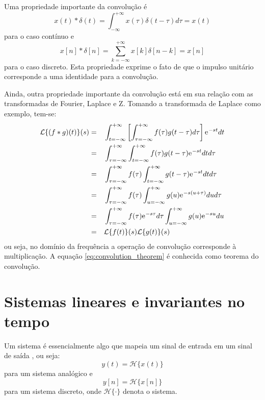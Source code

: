 \documentclass[12pt,a4paper]{report}
\newcommand{\euler}{{\mathrm{e}\mkern1mu}}
\begin{document}
  Uma propriedade importante da convolução é
  \begin{equation}
    \label{eq:continuous_convolution_identity}
    x(t) \ast \delta(t) = \int_{-\infty}^{+\infty} x(\tau) \delta(t - \tau) d\tau = x(t)
  \end{equation}
  para o caso contínuo e
  \begin{equation}
    \label{eq:discrete_convolution_identity}
    x[n] \ast \delta[n] = \sum_{k = -\infty}^{+\infty} x[k] \delta[n - k] = x[n]
  \end{equation}
  para o caso discreto. Esta propriedade exprime o fato de que o impulso unitário corresponde a uma identidade
  para a convolução.

  Ainda, outra propriedade importante da convolução está em sua relação com as transformadas de Fourier, Laplace
  e Z. Tomando a transformada de Laplace como exemplo, tem-se:
  \begin{equation}
    \label{eq:convolution_theorem}
    \begin{split}
      \mathcal{L}\{(f \ast g)(t)\}(s) = &\quad \int_{t = -\infty}^{+\infty} \left[\int_{\tau = -\infty}^{+\infty}
      f(\tau) g(t - \tau) d\tau\right] \euler^{-s t} dt
      \\ = &\quad \int_{\tau = -\infty}^{+\infty} \int_{t = -\infty}^{+\infty}
      f(\tau) g(t - \tau) \euler^{-s t} dt d\tau
      \\ = &\quad \int_{\tau = -\infty}^{+\infty} f(\tau) \int_{t = -\infty}^{+\infty}
      g(t - \tau) \euler^{-s t} dt d\tau
      \\ = &\quad \int_{\tau = -\infty}^{+\infty} f(\tau) \int_{u = -\infty}^{+\infty}
      g(u) \euler^{-s(u+\tau)} du d\tau
      \\ = &\quad \int_{\tau = -\infty}^{+\infty} f(\tau) \euler^{-s \tau} d\tau
      \int_{u = -\infty}^{+\infty} g(u) \euler^{-s u} du
      \\ = &\quad \mathcal{L}\{f(t)\}(s) \mathcal{L}\{g(t)\}(s)
    \end{split}
  \end{equation}
  ou seja, no domínio da frequência a operação de convolução corresponde à multiplicação. A equação
  \ref{eq:convolution_theorem} é conhecida como teorema do convolução.

\section{Sistemas lineares e invariantes no tempo}
  Um sistema é essencialmente algo que mapeia um sinal de entrada em um sinal de saída \cite{diniz}, ou seja:
  \begin{equation}
    y(t) = \mathcal{H}\{x(t)\}
  \end{equation}
  para um sistema analógico e
  \begin{equation}
    y[n] = \mathcal{H}\{x[n]\}
  \end{equation}
  para um sistema discreto, onde $\mathcal{H}\{\cdot\}$ denota o sistema.
\end{document}
